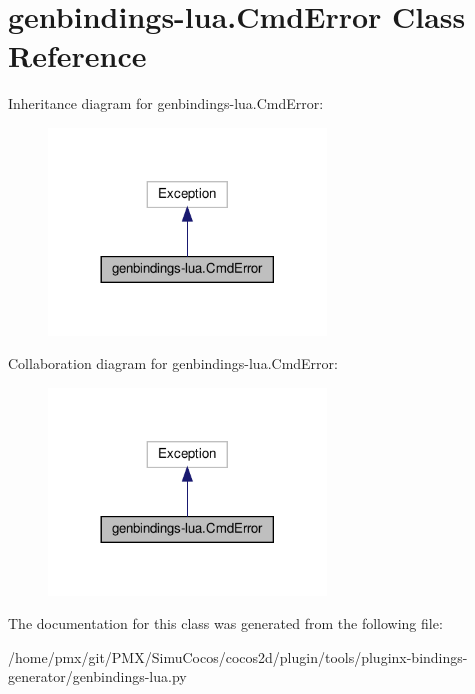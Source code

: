 \hypertarget{classgenbindings-lua_1_1CmdError}{}\section{genbindings-\/lua.Cmd\+Error Class Reference}
\label{classgenbindings-lua_1_1CmdError}


Inheritance diagram for genbindings-\/lua.Cmd\+Error\+:
\nopagebreak
\begin{figure}[H]
\begin{center}
\leavevmode
\includegraphics[width=209pt]{classgenbindings-lua_1_1CmdError__inherit__graph}
\end{center}
\end{figure}


Collaboration diagram for genbindings-\/lua.Cmd\+Error\+:
\nopagebreak
\begin{figure}[H]
\begin{center}
\leavevmode
\includegraphics[width=209pt]{classgenbindings-lua_1_1CmdError__coll__graph}
\end{center}
\end{figure}


The documentation for this class was generated from the following file\+:\begin{DoxyCompactItemize}
\item 
/home/pmx/git/\+P\+M\+X/\+Simu\+Cocos/cocos2d/plugin/tools/pluginx-\/bindings-\/generator/genbindings-\/lua.\+py\end{DoxyCompactItemize}

